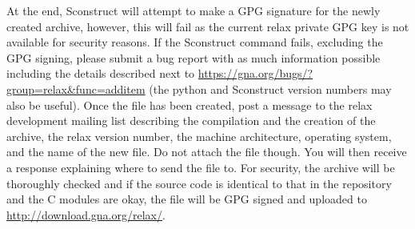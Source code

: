At the end, Sconstruct will attempt to make a GPG signature for the newly created archive, however, this will fail as the current relax private GPG key is not available for security reasons.  If the Sconstruct command fails, excluding the GPG signing, please submit a bug report with as much information possible including the details described next to \href{https://gna.org/bugs/?group=relax\&func=additem}{https://gna.org/bugs/?group=relax\&func=additem} (the python and Sconstruct version numbers may also be useful).  Once the file has been created, post a message to the relax development mailing list describing the compilation and the creation of the archive, the relax version number, the machine architecture, operating system, and the name of the new file.  Do not attach the file though.  You will then receive a response explaining where to send the file to.  For security, the archive will be thoroughly checked and if the source code is identical to that in the repository and the C modules are okay, the file will be GPG signed and uploaded to \href{http://download.gna.org/relax/}{http://download.gna.org/relax/}.
